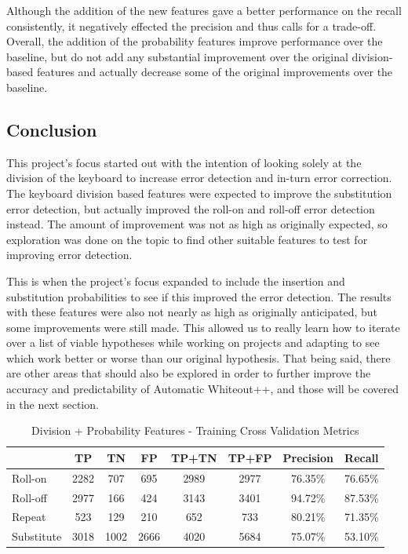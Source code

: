 \documentclass[letterpaper, 10 pt, conference]{ieeeconf}  %
\begin{document}
Although the addition of the new features gave a better performance on the recall consistently, it negatively effected the precision and thus calls for a trade-off.  Overall, the addition of the probability features improve performance over the baseline, but do not add any substantial improvement over the original division-based features and actually decrease some of the original improvements over the baseline.

\subsection{Conclusion}
This project's focus started out with the intention of looking solely at the division of the keyboard to increase error detection and in-turn error correction.  The keyboard division based features were expected to improve the substitution error detection, but actually improved the roll-on and roll-off error detection instead.  The amount of improvement was not as high as originally expected, so exploration was done on the topic to find other suitable features to test for improving error detection.

This is when the project's focus expanded to include the insertion and substitution probabilities to see if this improved the error detection.  The results with these features were also not nearly as high as originally anticipated, but some improvements were still made.  This allowed us to really learn how to iterate over a list of viable hypotheses while working on projects and adapting to see which work better or worse than our original hypothesis.  That being said, there are other areas that should also be explored in order to further improve the accuracy and predictability of Automatic Whiteout++, and those will be covered in the next section.

\begin{table}[h]
\begin{center}
\begin{tabular}{|l|c|c|c|c|c|c|c|} \hline
& TP & TN & FP & TP+TN & TP+FP & Precision & Recall \\ \hline
Roll-on & 2282 & 707 & 695 & 2989 & 2977 & 76.35\% & 76.65\% \\ \hline
Roll-off & 2977 & 166 & 424 & 3143 & 3401 & 94.72\% & 87.53\% \\ \hline
Repeat & 523 & 129 & 210 & 652 & 733 & 80.21\% & 71.35\% \\ \hline
Substitute & 3018 & 1002 & 2666 & 4020 & 5684 & 75.07\% & 53.10\% \\ \hline
\end{tabular}
\caption{Division + Probability Features - Training Cross Validation Metrics}
\label{table:allcvm}
\end{center}
\end{table}
\end{document}
